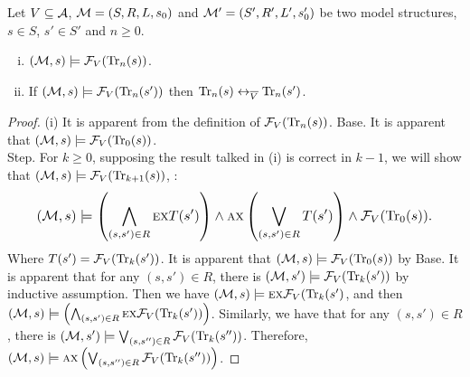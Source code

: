 \documentclass{article}
\begin{document}
\begin{lemma}\label{Bn:to:Tn}
Let $V\subseteq {\cal A}$, ${\cal M}=(S, R, L,s_0)$ and ${\cal M}'=(S', R', L',s_0')$ be two model structures,
$s\in S$, $s'\in S'$ and $n\ge 0$.
\begin{enumerate}[(i)]
  \item $({\cal M},s)\models{\cal F}_V(\textrm{Tr}_n(s))$.
  \item If $({\cal M},s)\models{\cal F}_V(\textrm{Tr}_n(s'))$ then
  $\textrm{Tr}_n(s) \leftrightarrow_{\overline V} \textrm{Tr}_n(s')$.
\end{enumerate}
\end{lemma}
\begin{proof}
(i) It is apparent from the definition of ${\cal F}_V(\textrm{Tr}_n(s))$.
Base. It is apparent that $({\cal M},s)\models {\cal F}_V(\textrm{Tr}_0(s))$.\\
Step. For $k \geq 0$, supposing the result talked in (i) is correct in $k - 1$, we will show that $({\cal M},s)\models {\cal F}_V(\textrm{Tr}_{k+1}(s))$, \ie:
\begin{equation*}
\resizebox{.91\linewidth}{!}{$
    \displaystyle
 ({\cal M},s)\models \left(\bigwedge_{(s,s')\in R}
    \EXIST \NEXT T(s')\right)
    \wedge \ALL \NEXT\left(\bigvee_{(s,s')\in R}
    T(s')\right)
    \wedge {\cal F}_V(\Tr_0(s)).%
 $}
\end{equation*}
Where $T(s') ={\cal F}_V(\textrm{Tr}_k(s'))$. It is apparent that $({\cal M},s)\models {\cal F}_V(\textrm{Tr}_0(s))$ by Base. It is apparent that for any $(s,s') \in R$, there is $({\cal M}, s') \models {\cal F}_V(\textrm{Tr}_k(s'))$ by inductive assumption. Then we have $({\cal M},s)\models \textsc{e} \textsc{x} {\cal F}_V(\textrm{Tr}_k(s')$, and then $({\cal M},s)\models \left(\bigwedge_{(s,s')\in R}
    \textsc{e} \textsc{x} {\cal F}_V(\textrm{Tr}_k(s'))\right)$. Similarly, we have that for any $(s,s') \in R$, there is $({\cal M}, s') \models \bigvee_{(s,s'')\in R}
    {\cal F}_V(\textrm{Tr}_k(s'') )$. Therefore, $({\cal M},s)\models \textsc{a} \textsc{x}\left(\bigvee_{(s,s'')\in R}
    {\cal F}_V(\textrm{Tr}_k(s'') )\right)$.


\end{proof}
\end{document}
